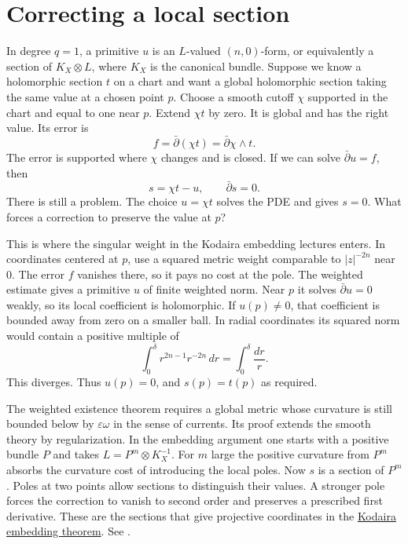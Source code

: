 \section{Correcting a local section}
\label{section-cutoff-section}

In degree $q=1$, a primitive $u$ is an
$L$-valued $(n,0)$-form, or equivalently
a section of $K_X\otimes L$, where $K_X$
is the canonical bundle. Suppose we know
a holomorphic section $t$ on a chart and
want a global holomorphic section taking
the same value at a chosen point $p$.
Choose a smooth cutoff $\chi$ supported
in the chart and equal to one near $p$.
Extend $\chi t$ by zero. It is global
and has the right value. Its error is
$$
f=\bar\partial(\chi t)=\bar\partial\chi
\wedge t.
$$
The error is supported where $\chi$
changes and is closed. If we can solve
$\bar\partial u=f$, then
$$
s=\chi t-u,\qquad\bar\partial s=0.
$$
There is still a problem. The choice
$u=\chi t$ solves the PDE and gives
$s=0$. What forces a correction to
preserve the value at $p$?

This is where the singular weight in the
Kodaira embedding lectures enters. In
coordinates centered at $p$, use a
squared metric weight comparable to
$|z|^{-2n}$ near $0$. The error $f$
vanishes there, so it pays no cost at the
pole. The weighted estimate gives a
primitive $u$ of finite weighted norm.
Near $p$ it solves $\bar\partial u=0$
weakly, so its local coefficient is
holomorphic. If $u(p)\ne0$, that
coefficient is bounded away from zero on
a smaller ball. In radial coordinates its
squared norm would contain a positive
multiple of
$$
\int_0^\delta r^{2n-1}r^{-2n}\,dr
=\int_0^\delta\frac{dr}{r}.
$$
This diverges. Thus $u(p)=0$, and
$s(p)=t(p)$ as required.

The weighted existence theorem requires
a global metric whose curvature is still
bounded below by $\varepsilon\omega$ in
the sense of currents. Its proof extends
the smooth theory by regularization. In
the embedding argument one starts with a
positive bundle $P$ and takes
$L=P^m\otimes K_X^{-1}$. For $m$ large
the positive curvature from $P^m$ absorbs
the curvature cost of introducing the
local poles. Now $s$ is a section of
$P^m$. Poles at two points allow sections
to distinguish their values. A stronger
pole forces the correction to vanish to
second order and preserves a prescribed
first derivative. These are the sections
that give projective coordinates in the
\href{https://www.heap-project.org/tag/0679}
{Kodaira embedding theorem}. See
\cite[Corollaries 5.3, 5.12--5.13 and
Exercise 5.14]{demailly-cime}.


